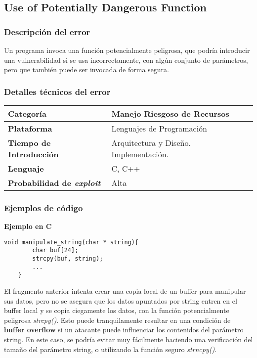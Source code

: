 \subsection{Use of Potentially Dangerous Function}

\subsubsection{Descripción del error}
Un programa invoca una función potencialmente peligrosa, que podría introducir una vulnerabilidad si se usa incorrectamente, con algún conjunto de parámetros, pero que
también puede ser invocada de forma segura.

\subsubsection{Detalles técnicos del error}
\begin{tabular}[\baselineskip]{|l|p{7cm}|}
  \hline
  \textbf{Categoría} & Manejo Riesgoso de Recursos \\
  \hline
  \textbf{Plataforma} & Lenguajes de Programación \\
  \hline
  \textbf{Tiempo de Introducción} & Arquitectura y Diseño. Implementación. \\
  \hline
  \textbf{Lenguaje} & C, C++ \\
  \hline
  \textbf{Probabilidad de \emph{exploit}} & Alta \\
  \hline
\end{tabular}

\subsubsection{Ejemplos de código}
\noindent \textbf{Ejemplo en C}\\

\begin{lstlisting}[frame=single]
    void manipulate_string(char * string){
        char buf[24];
        strcpy(buf, string);
        ...
    }
\end{lstlisting}

El fragmento anterior intenta crear una copia local de un buffer para manipular sus datos, pero no se asegura que los datos apuntados por string entren en el
buffer local y se copia ciegamente los datos, con la función potencialmente peligrosa \textit{strcpy()}. Esto puede tranquilamente resultar en una condición de \textbf{buffer overflow}
si un atacante puede influenciar los contenidos del parámetro string.
En este caso, se podría evitar muy fácilmente haciendo una verificación del tamaño del parámetro string, o utilizando la función seguro \textit{strncpy()}.

